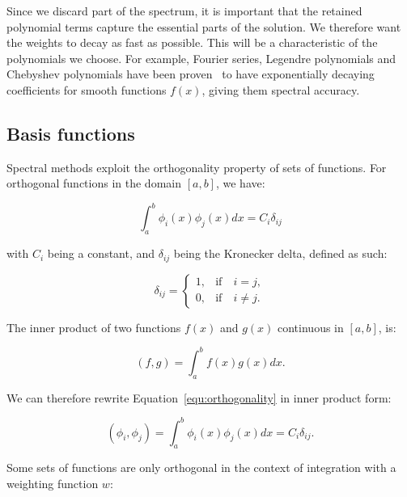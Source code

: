 Since we discard part of the spectrum, it is important that the retained polynomial terms capture
the essential parts of the solution. We therefore want the weights to decay as fast as possible.
This will be a characteristic of the polynomials we choose. For example, Fourier series, Legendre
polynomials and Chebyshev polynomials have been proven~\cite{Kopriva2009} to have exponentially
decaying coefficients for smooth functions \(f(x)\), giving them spectral accuracy.

\subsection{Basis functions}\label{subsection:spectral_element_method:spectral_approximation:basis_functions}

Spectral methods exploit the orthogonality property of sets of functions. For orthogonal
functions in the domain \([a, b]\), we have:

\begin{equation} \label{equ:orthogonality}
	\int_{a}^{b}\phi_i(x) \phi_j(x)dx = C_i \delta_{i j}
\end{equation}

\noindent
with \(C_i\) being a constant, and \(\delta_{i j}\) being the Kronecker delta, defined as such:

\begin{equation} \label{equ:kronecker}
	\delta _{i j} = \left \{ \begin{matrix}
                    1, & \textrm{if} \quad i = j,\\ 
                    0, & \textrm{if} \quad i \neq j.
                    \end{matrix} \right.
\end{equation}

The inner product of two functions \(f(x)\) and \(g(x)\) continuous in
\(\left[ a, b \right]\), is:

\begin{equation}
    \left( f, g \right) = \int_{a}^{b} f(x) g(x) dx.
\end{equation}

\noindent
We can therefore rewrite Equation~\ref{equ:orthogonality} in inner product form:

\begin{equation}
	\left( \phi_i, \phi_j \right) = \int_{a}^{b} \phi_i(x) \phi_j(x) dx = C_i \delta_{i j}.
\end{equation}

Some sets of functions are only orthogonal in the context of integration with a weighting function \(w\):

